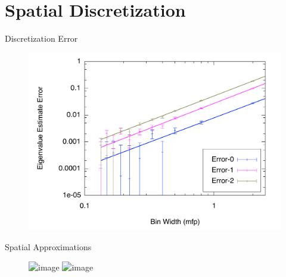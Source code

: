 \documentclass[xcolor={usenames, dvipsnames},]{beamer}
\begin{document}
\section{Spatial Discretization}
\begin{frame}{Discretization Error}
    \begin{figure}\centering
        \includegraphics[width=.90\textwidth,keepaspectratio]{Figures/EigenvalueError}
    \end{figure}
\end{frame}
\begin{frame}{Spatial Approximations}
    \begin{figure}
        \includegraphics<1>[width=\textwidth,keepaspectratio]{Figures/HistogramCartoon}
        \includegraphics<2>[width=\textwidth,keepaspectratio]{Figures/LinearCartoon}
    \end{figure}
\end{frame}
\end{document}
